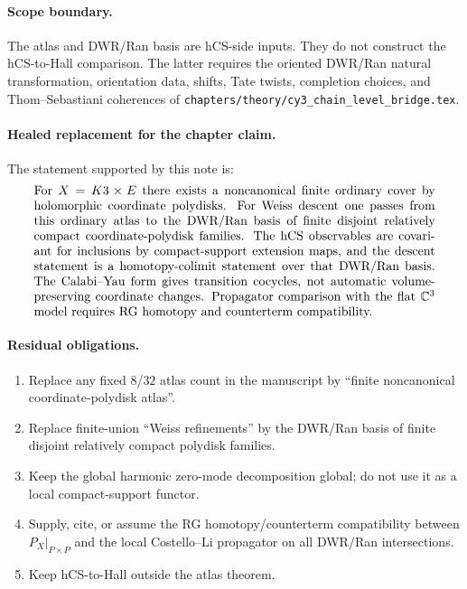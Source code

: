 \paragraph{Scope boundary.}
\ClaimStatusVerified{}
The atlas and DWR/Ran basis are hCS-side inputs. They do not construct
the hCS-to-Hall comparison. The latter requires the oriented
DWR/Ran natural transformation, orientation data, shifts, Tate twists,
completion choices, and Thom--Sebastiani coherences of
\verb|chapters/theory/cy3_chain_level_bridge.tex|.

\paragraph{Healed replacement for the chapter claim.}
The statement supported by this note is:
\[
\begin{minipage}{0.92\linewidth}
For $X=K3\times E$ there exists a noncanonical finite ordinary cover by
holomorphic coordinate polydisks. For Weiss descent one passes from this
ordinary atlas to the DWR/Ran basis of finite disjoint relatively
compact coordinate-polydisk families. The hCS observables are covariant
for inclusions by compact-support extension maps, and the descent
statement is a homotopy-colimit statement over that DWR/Ran basis.
The Calabi--Yau form gives transition cocycles, not automatic
volume-preserving coordinate changes. Propagator comparison with the
flat $\C^3$ model requires RG homotopy and counterterm compatibility.
\end{minipage}
\]

\paragraph{Residual obligations.}
\begin{enumerate}
\item Replace any fixed $8$/$32$ atlas count in the manuscript by
``finite noncanonical coordinate-polydisk atlas''.
\item Replace finite-union ``Weiss refinements'' by the DWR/Ran basis
of finite disjoint relatively compact polydisk families.
\item Keep the global harmonic zero-mode decomposition global; do not
use it as a local compact-support functor.
\item Supply, cite, or assume the RG homotopy/counterterm compatibility
between $P_X|_{P\times P}$ and the local Costello--Li propagator on
all DWR/Ran intersections.
\item Keep hCS-to-Hall outside the atlas theorem.
\end{enumerate}

